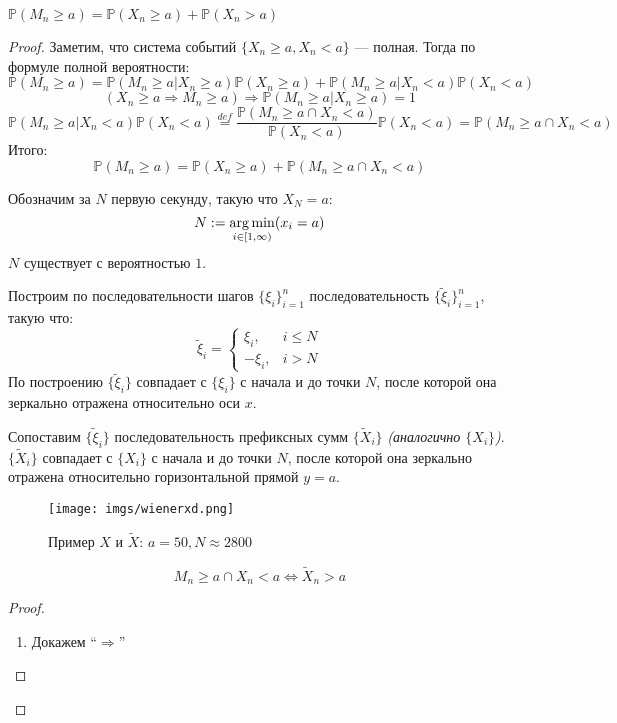 \begin{statement}
    $\mathbb P(M_n \geq a) = \mathbb P(X_n \geq a) + \mathbb P(X_n > a)$
\end{statement}
\begin{proof}
    Заметим, что система событий $\{X_n \geq a, X_n < a\}$ --- полная. Тогда по формуле полной вероятности:
    $$\mathbb P(M_n \geq a) = \mathbb P(M_n \geq a | X_n \geq a) \mathbb P(X_n \geq a) + \mathbb P(M_n \geq a | X_n < a) \mathbb P(X_n < a)$$
    $$(X_n \geq a \Rightarrow M_n \geq a) \Rightarrow \mathbb P(M_n \geq a | X_n \geq a)=1$$
    $$\mathbb P(M_n \geq a | X_n < a) \mathbb P(X_n < a)\stackrel{def}=\frac{\mathbb P(M_n \geq a \cap X_n < a)}{\mathbb P(X_n < a)}\mathbb P(X_n < a)=\mathbb P(M_n \geq a \cap X_n < a)$$
    Итого:
    $$\mathbb P(M_n \geq a) = \mathbb P(X_n \geq a) + \mathbb P(M_n \geq a \cap X_n < a)$$

    Обозначим за $N$ первую секунду, такую что $X_N=a$:
    $$N:=\operatorname*{arg\,min}_{i\in[1,\infty)}(x_i=a)$$
    $N$ существует с вероятностью $1$.

    Построим по последовательности шагов $\{\xi_i\}_{i=1}^n$ последовательность $\{\tilde \xi_i\}_{i=1}^n$, такую что:
    $$\tilde \xi_i=\begin{cases}
        \xi_i ,& i\leq N \\
        -\xi_i ,& i>N
    \end{cases}$$
    По построению $\{\tilde \xi_i\}$ совпадает с $\{\xi_i\}$ с начала и до точки $N$, после которой она зеркально отражена относительно оси $x$.
    
    Сопоставим $\{\tilde \xi_i\}$ последовательность префиксных сумм $\{\tilde X_i\}$ \textit{(аналогично $\{X_i\}$)}. $\{\tilde X_i\}$ совпадает с $\{X_i\}$ с начала и до точки $N$, после которой она зеркально отражена относительно горизонтальной прямой $y=a$.

    \clearpage

    \begin{figure}
        \texttt{[image: imgs/wienerxd.png]}
        \centering
        \caption{Пример \(X\) и $\tilde X$: $a=50, N\approx 2800$}
    \end{figure}

    \begin{statement}
        $$M_n \geq a \cap X_n < a \Leftrightarrow \tilde X_n > a$$
    \end{statement}
    \begin{proof}
        \begin{enumerate}
            \item Докажем ``$\Rightarrow$''
    

\end{enumerate}
\end{proof}
\end{proof}

